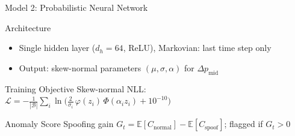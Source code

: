 \documentclass{beamer}
\begin{document}
\begin{frame}{Model 2: Probabilistic Neural Network \cite{fabre_2025}}
    \begin{block}{Architecture}
        \begin{itemize}
            \item Single hidden layer ($d_h{=}64$, ReLU), Markovian: last time step only
            \item Output: skew-normal parameters $(\mu, \sigma, \alpha)$ for $\Delta p_{\text{mid}}$
        \end{itemize}
    \end{block}
    \begin{block}{Training Objective}
        Skew-normal NLL: $\mathcal{L} = -\frac{1}{|\mathcal{B}|}\sum_i \ln\bigl(\frac{2}{\sigma_i}\,\varphi(z_i)\,\Phi(\alpha_i z_i) + 10^{-10}\bigr)$
    \end{block}
    \begin{block}{Anomaly Score}
        Spoofing gain $G_t = \mathbb{E}[C_{\text{normal}}] - \mathbb{E}[C_{\text{spoof}}]$; flagged if $G_t > 0$
    \end{block}
\end{frame}
\end{document}

